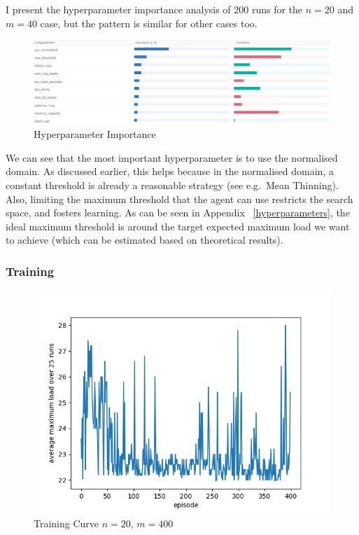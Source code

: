 I present the hyperparameter importance analysis of $200$ runs for the $n=20$ and $m=40$ case, but the pattern is similar for other cases too.


\begin{figure}[hbt!] \label{two-thinning-hyperparameter-importance}
    \centering
    \includegraphics[scale=0.4]{Chapter4/Figs/Hyperparameter_importance_20_400.png}
    \caption{\TwoThinning Hyperparameter Importance}
\end{figure}
We can see that the most important hyperparameter is to use the normalised domain. As discussed earlier, this helps because in the normalised domain, a constant threshold is already a reasonable strategy (see e.g.\ Mean Thinning). Also, limiting the maximum threshold that the agent can use restricts the search space, and fosters learning. As can be seen in Appendix ~\ref{hyperparameters}, the ideal maximum threshold is around the target expected maximum load we want to achieve (which can be estimated based on theoretical results).



\subsubsection{Training}


\begin{figure}[hbt!] \label{two-thinning-training-curve}
    \centering
    \includegraphics[scale=1.0]{Chapter4/Figs/training_progression_20_400.png}
    \caption{\TwoThinning Training Curve $n=20$, $m=400$}
\end{figure}

